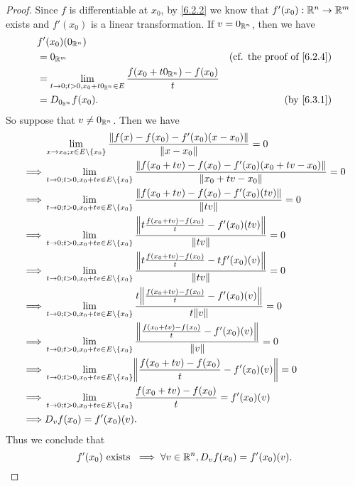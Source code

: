 \begin{proof}
  Since \(f\) is differentiable at \(x_0\), by \cref{6.2.2} we know that \(f'(x_0) : \mathbb{R}^n \to \mathbb{R}^m\) exists and \(f'(x_0)\) is a linear transformation.
  If \(v = 0_{\mathbb{R}^n}\), then we have
  \begin{align*}
     & f'(x_0)(0_{\R^n})                                                                                                                \\
     & = 0_{\R^m}                                                                              & \text{(cf. the proof of \cref{6.2.4})} \\
     & = \lim_{t \to 0 ; t > 0, x_0 + t 0_{\R^n} \in E} \frac{f(x_0 + t 0_{\R^n}) - f(x_0)}{t}                                          \\
     & = D_{0_{\R^n}} f(x_0).                                                                  & \text{(by \cref{6.3.1})}
  \end{align*}
  So suppose that \(v \neq 0_{\mathbb{R}^n}\).
  Then we have
  \begin{align*}
             & \lim_{x \to x_0 ; x \in E \setminus \{x_0\}} \frac{\norm*{f(x) - f(x_0) - f'(x_0)(x - x_0)}}{\norm*{x - x_0}} = 0                                  \\
    \implies & \lim_{t \to 0 ; t > 0, x_0 + tv \in E \setminus \{x_0\}} \frac{\norm*{f(x_0 + tv) - f(x_0) - f'(x_0)(x_0 + tv - x_0)}}{\norm*{x_0 + tv - x_0}} = 0 \\
    \implies & \lim_{t \to 0 ; t > 0, x_0 + tv \in E \setminus \{x_0\}} \frac{\norm*{f(x_0 + tv) - f(x_0) - f'(x_0)(tv)}}{\norm*{tv}} = 0                         \\
    \implies & \lim_{t \to 0 ; t > 0, x_0 + tv \in E \setminus \{x_0\}} \frac{\norm*{t \frac{f(x_0 + tv) - f(x_0)}{t} - f'(x_0)(tv)}}{\norm*{tv}} = 0             \\
    \implies & \lim_{t \to 0 ; t > 0, x_0 + tv \in E \setminus \{x_0\}} \frac{\norm*{t \frac{f(x_0 + tv) - f(x_0)}{t} - t f'(x_0)(v)}}{\norm*{tv}} = 0            \\
    \implies & \lim_{t \to 0 ; t > 0, x_0 + tv \in E \setminus \{x_0\}} \frac{t \norm*{\frac{f(x_0 + tv) - f(x_0)}{t} - f'(x_0)(v)}}{t \norm*{v}} = 0             \\
    \implies & \lim_{t \to 0 ; t > 0, x_0 + tv \in E \setminus \{x_0\}} \frac{\norm*{\frac{f(x_0 + tv) - f(x_0)}{t} - f'(x_0)(v)}}{\norm*{v}} = 0                 \\
    \implies & \lim_{t \to 0 ; t > 0, x_0 + tv \in E \setminus \{x_0\}} \norm*{\frac{f(x_0 + tv) - f(x_0)}{t} - f'(x_0)(v)} = 0                                   \\
    \implies & \lim_{t \to 0 ; t > 0, x_0 + tv \in E \setminus \{x_0\}} \frac{f(x_0 + tv) - f(x_0)}{t} = f'(x_0)(v)                                               \\
    \implies & D_v f(x_0) = f'(x_0)(v).
  \end{align*}
  Thus we conclude that
  \[
    f'(x_0) \text{ exists } \implies \forall v \in \mathbb{R}^n, D_v f(x_0) = f'(x_0)(v).
  \]
\end{proof}

